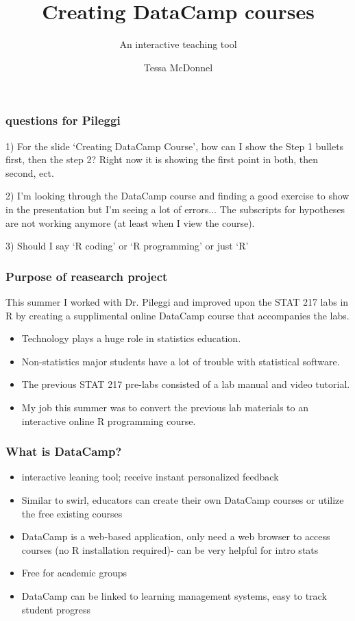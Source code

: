 \documentclass{beamer}
\title{Creating DataCamp courses}
\subtitle{An interactive teaching tool}
\author{Tessa McDonnel}
\institute{Cal Poly San Luis Obispo}
\date{}
\begin{document}
 
\frame{\titlepage}

\begin{frame}
\frametitle{questions for Pileggi}

1) For the slide `Creating DataCamp Course', how can I show the Step 1 bullets first, then the step 2?
Right now it is showing the first point in both, then second, ect.

2) I'm looking through the DataCamp course and finding a good exercise to show in the presentation but I'm seeing a lot of 
errors... The subscripts for hypotheses are not working anymore (at least when I view the course).

3) Should I say `R coding' or `R programming' or just `R'
\end{frame}

\begin{frame}
\frametitle{Purpose of reasearch project}

This summer I worked with Dr. Pileggi and improved upon the STAT 217 labs in R by creating
a supplimental online DataCamp course that accompanies the labs. 

\begin{itemize}
 \item<1-> Technology plays a huge role in statistics education.
 \item<2-> Non-statistics major students have a lot of trouble with statistical software.
 \item<3-> The previous STAT 217 pre-labs consisted of a lab manual and video tutorial.
 \item<4-> My job this summer was to convert the previous lab materials to an interactive online R programming course.
\end{itemize}

\end{frame}
 
\begin{frame}
\frametitle{What is DataCamp?}
\begin{itemize}
 \item<1-> interactive leaning tool; receive instant personalized feedback
 \item<2-> Similar to swirl, educators can create their own DataCamp courses or utilize the free existing courses 
 \item<3-> DataCamp is a web-based application, only need a web browser to access courses (no R installation required)- can be very helpful for intro stats 
 \item<4-> Free for academic groups 
 \item<5-> DataCamp can be linked to learning management systems, easy to track student progress
\end{itemize}
\end{frame}
\end{document}
